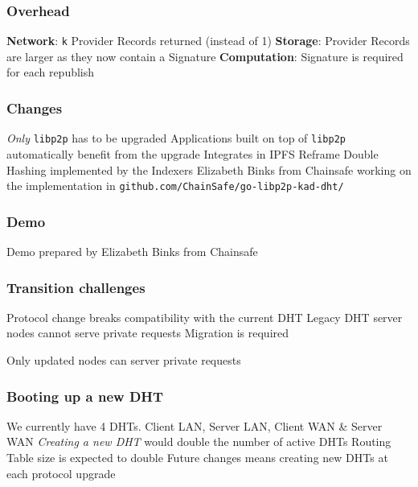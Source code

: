 \documentclass{pl-slide}
\begin{document}
\begin{frame}
\frametitle{Overhead}
\begin{itemize}
	\itemc \textbf{Network}: \texttt{k} Provider Records returned (instead of 1)
	\itemc \textbf{Storage}: Provider Records are larger as they now contain a Signature
	\itemc \textbf{Computation}: Signature is required for each republish 
\end{itemize}
\end{frame}

\begin{frame}
\frametitle{Changes}
\begin{itemize}
	\itemc \textit{Only} \texttt{libp2p} has to be upgraded
	\itemc Applications built on top of \texttt{libp2p} automatically benefit from the upgrade
	\itemc Integrates in IPFS Reframe
	\itemc Double Hashing implemented by the Indexers
	\bigskip
	\itemc Elizabeth Binks from Chainsafe working on the implementation in \texttt{github.com/ChainSafe/go-libp2p-kad-dht/}
\end{itemize}
\end{frame}

\begin{frame}
\frametitle{Demo}
\begin{itemize}
	\itemc Demo prepared by Elizabeth Binks from Chainsafe 
\end{itemize}
\end{frame}

\begin{frame}
\frametitle{Transition challenges}
\begin{itemize}
	\itemc Protocol change breaks compatibility with the current DHT
	\itemc Legacy DHT server nodes cannot serve private requests
	\itemc Migration is required
	
	\itemc Only updated nodes can server private requests
\end{itemize}
\end{frame}

\begin{frame}
\frametitle{Booting up a new DHT}
\begin{itemize}
	\itemc We currently have 4 DHTs. Client LAN, Server LAN, Client WAN \& Server WAN
	\itemc \textit{Creating a new DHT} would double the number of active DHTs
	\itemc Routing Table size is expected to double
	\itemc Future changes means creating new DHTs at each protocol upgrade
\end{itemize}
\end{frame}
\end{document}
